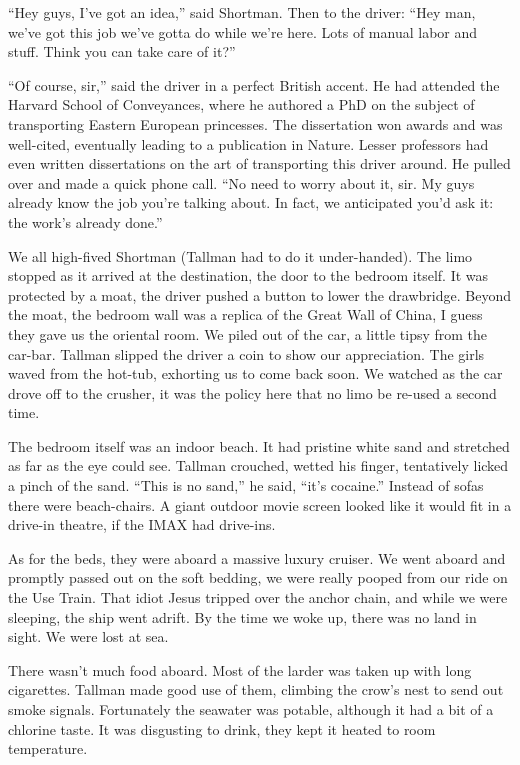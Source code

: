 \documentclass[oneside]{book}
\begin{document}
``Hey guys, I've got an idea,'' said Shortman.  Then to the driver:  ``Hey man, we've got this job we've gotta do while
we're here.  Lots of manual labor and stuff.  Think you can take care of it?''

``Of course, sir,'' said the driver in a perfect British accent.  He had attended the Harvard School of Conveyances,
where he authored a PhD on the subject of transporting Eastern European princesses.
The dissertation won awards and was well-cited, eventually leading to a
publication in Nature.
Lesser professors had even written dissertations on the art of transporting this driver around.
He pulled over and made a quick phone call.  ``No need to worry about it, sir.  My guys already know the job
you're talking about.  In fact, we anticipated you'd ask it: the work's already done.''

We all high-fived Shortman (Tallman had to do it under-handed).  The limo stopped as it arrived at the destination,
the door to the bedroom itself.  It was protected by a moat, the driver pushed a button to lower
the drawbridge.  Beyond the moat, the bedroom wall was a replica of the Great Wall of China,
I guess they gave us the oriental room.
We piled out of the car, a little tipsy from the car-bar.  Tallman slipped the driver a
coin to show our appreciation.  The girls waved from the hot-tub, exhorting us to come back soon.
We watched as the car drove off to the crusher, it was the policy here that no limo be re-used a second time.

The bedroom itself was an indoor beach.  It had pristine white sand and stretched as far as the eye
could see.  Tallman crouched, wetted his finger, tentatively licked a pinch of the sand.
``This is no sand,'' he said, ``it's cocaine.''
Instead of sofas there were beach-chairs.  A giant outdoor movie screen looked like
it would fit in a drive-in theatre, if the IMAX had drive-ins.

As for the beds, they were aboard a massive luxury cruiser.
We went aboard and promptly passed out on the soft bedding, we were really pooped from our ride on the Use Train.
That idiot Jesus tripped over the anchor chain, and while we were sleeping, the ship went adrift.
By the time we woke up, there was no land in sight.  We were lost at sea.

There wasn't much food aboard.  Most of the larder was taken up with long cigarettes.  Tallman made good use of them,
climbing the crow's nest to send out smoke signals.  Fortunately the seawater was potable,
although it had a bit of a chlorine taste.  It was disgusting to drink,
they kept it heated to room temperature.
\end{document}
